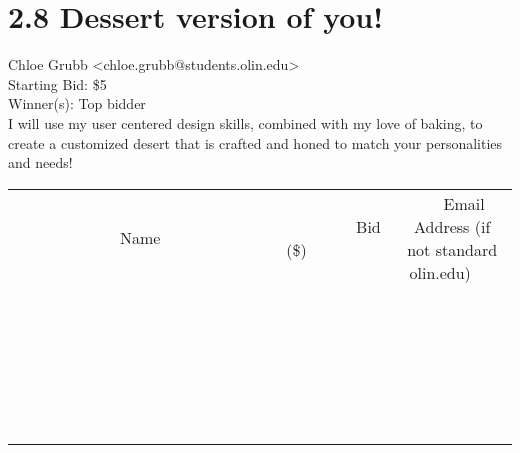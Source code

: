 \documentclass[11pt]{article}
\begin{document}
					\section*{2.8 Dessert version of you!}
					Chloe Grubb <chloe.grubb@students.olin.edu> \\
					Starting Bid: \$5 \\
					Winner(s): Top bidder \\
					I will use my user centered design skills, combined with my love of baking, to create a customized desert that is crafted and honed to match your personalities and needs! \\
					[6ex]
					\begin{tabular}{c c c}
						~~~~~~~~~~~~~Name~~~~~~~~~~~~~ & ~~~~~~~~~Bid (\$)~~~~~~~~~ & ~~~Email Address (if not standard olin.edu)~~~ \\
				
 & & \\
\hline
 & & \\
\hline
 & & \\
\hline
 & & \\
\hline
 & & \\
\hline
 & & \\
\hline
 & & \\
\hline
 & & \\
\hline
 & & \\
\hline
 & & \\
\hline
 & & \\
\hline
 & & \\
\hline
 & & \\
\hline
 & & \\
\hline
 & & \\
\hline
 & & \\
\hline
 & & \\
\hline
 & & \\
\hline
 & & \\
\hline
 & & \\
\hline
 & & \\
\hline
 & & \\
\hline
 & & \\
\hline
 & & \\
\hline
 & & \\
\hline
 & & \\
\hline
					\end{tabular}
					\clearpage
				
\end{document}
